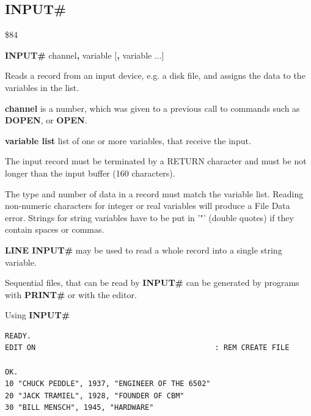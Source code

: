 
\newpage
\subsection{INPUT\#}
\begin{description}[leftmargin=2cm,style=nextline]
\item [Token:]    \$84

\item [Format:]   {\bf INPUT\#} channel{\bf,} variable [{\bf,} variable ...]

\item [Usage:]    Reads a record from an input device, e.g. a disk file, and assigns the data to the variables in the list.

                  {\bf channel} is a number, which was given to a previous call to commands such as {\bf DOPEN}, or {\bf OPEN}.

                  {\bf variable list} list of one or more variables, that receive the input.

                  The input record must be terminated by a RETURN character and must be not longer than the input buffer (160 characters).

\item [Remarks:]  The type and number of data in a record must match the variable list. Reading non-numeric characters for integer or real variables will produce a File Data error. Strings for string variables have to be put in '"' (double quotes) if they contain spaces or commas.
               
                  {\bf LINE INPUT\#} may be used to read a whole record into a single string variable.

                  Sequential files, that can be read by {\bf INPUT\#} can be generated by programs with {\bf PRINT\#} or with the editor.

\item [Example:]  Using {\bf INPUT\#}

\begin{tcolorbox}[colback=black,coltext=white]
\verbatimfont{\codefont}
\begin{verbatim}
READY.
EDIT ON                                         : REM CREATE FILE

OK.
10 "CHUCK PEDDLE", 1937, "ENGINEER OF THE 6502"
20 "JACK TRAMIEL", 1928, "FOUNDER OF CBM"
30 "BILL MENSCH", 1945, "HARDWARE"


\end{verbatim}
\end{tcolorbox}
\end{description}
